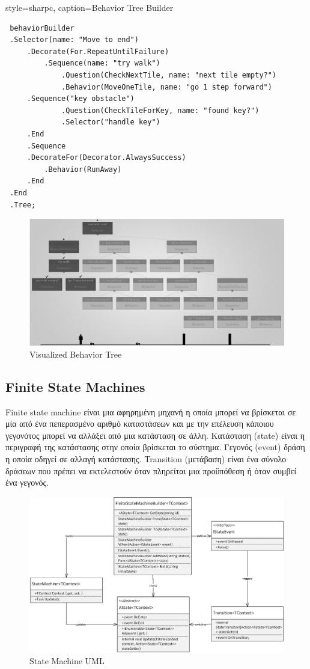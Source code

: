 	\lstset
	{
		style=sharpc, 
		caption={Behavior Tree Builder}
	}
	\begin{lstlisting}	
 behaviorBuilder
 .Selector(name: "Move to end")
	 .Decorate(For.RepeatUntilFailure)
		 .Sequence(name: "try walk")
			 .Question(CheckNextTile, name: "next tile empty?")
			 .Behavior(MoveOneTile, name: "go 1 step forward")
	 .Sequence("key obstacle")
			 .Question(CheckTileForKey, name: "found key?")
			 .Selector("handle key")
	 .End
	 .Sequence
	 .DecorateFor(Decorator.AlwaysSuccess)
		 .Behavior(RunAway)
	 .End
 .End
 .Tree;
	\end{lstlisting}


\begin{figure}[h!]
	\centering
	\includegraphics[width=165mm]{Images/visualized_behavior_tree}
	\caption{Visualized Behavior Tree}
	\label{fig:visualized_behavior_tree}
\end{figure}
	

\subsection{Finite State Machines}	
 Finite state machine είναι μια αφηρημένη μηχανή η οποία μπορεί να βρίσκεται σε μία από ένα πεπερασμένο αριθμό καταστάσεων και με την επέλευση κάποιου γεγονότος μπορεί να αλλάξει από μια κατάσταση σε άλλη. 
 Κατάσταση (state) είναι η περιγραφή της κατάστασης στην οποία βρίσκεται το σύστημα.
 Γεγονός (event) δράση η οποία οδηγεί σε αλλαγή κατάστασης.
 Transition (μετάβαση) είναι ένα σύνολο δράσεων που πρέπει να εκτελεστούν όταν πληρείται μια προϋπόθεση ή όταν συμβεί ένα γεγονός.

 
\begin{figure}[h!]
	\centering
	\includegraphics[width=165mm]{Images/state_machine_uml}
	\caption{State Machine UML}
	\label{fig:state_machine_uml}
\end{figure}	

